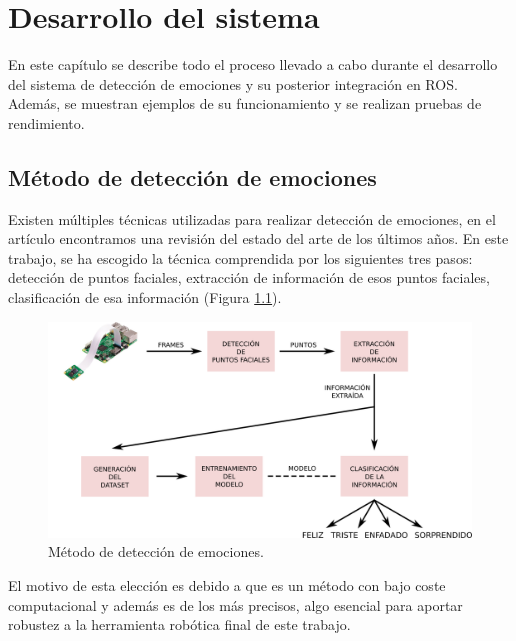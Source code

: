 \chapter{Desarrollo del sistema}
\label{cap:capitulo4}

En este capítulo se describe todo el proceso llevado a cabo durante el desarrollo del sistema de detección de emociones y su posterior integración en ROS. Además, se muestran ejemplos de su funcionamiento y se realizan pruebas de rendimiento.

\section{Método de detección de emociones}
\label{sec:metodo}

Existen múltiples técnicas utilizadas para realizar detección de emociones, en el artículo \cite{literature_review} encontramos una revisión del estado del arte de los últimos años. En este trabajo, se ha escogido la técnica comprendida por los siguientes tres pasos: detección de puntos faciales, extracción de información de esos puntos faciales, clasificación de esa información (Figura \ref{fig:metodo}).\\

\begin{figure} [h!]
  \begin{center}
    \includegraphics[width=16cm]{figs/metodo.png}
  \end{center}
  \captionsetup{justification=centering}
  \caption{Método de detección de emociones.}
  \label{fig:metodo}
\end{figure}

El motivo de esta elección es debido a que es un método con bajo coste computacional y además es de los más precisos, algo esencial para aportar robustez a la herramienta robótica final de este trabajo.

